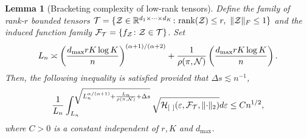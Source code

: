 \documentclass[11pt]{article}
\theoremstyle{plain}
\newtheorem{lem}{Lemma}
\theoremstyle{definition}
\def\rank{\textup{rank}}
\begin{document}
\begin{lem}[Bracketing complexity of low-rank tensors] \label{lem:metric}
Define the family of rank-$r$ bounded tensors $\tT=\{\tZ\in\mathbb{R}^{d_1\times \cdots \times d_K}\colon \rank(\tZ)\leq r, \ \FnormSize{}{\tZ}\leq 1\}$ and the induced function family $\mathcal{F}_{\mathcal{T}} = \{f_{\mathcal{Z}}\colon \mathcal{Z}\in\mathcal{T}\}$.  Set 
\begin{equation}\label{eq:specification}
L_n\asymp \left({d_{\max}rK\log K \over n } \right)^{(\alpha+1)/(\alpha+2)} + {1\over \rho (\pi, \mathcal{N})}\left({d_{\max}rK\log K \over n } \right).
\end{equation}
 Then, the following inequality is satisfied provided that $\Delta s \lesssim n^{-1}$,
\begin{equation}\label{eq:L}
{1\over L_n}\int^{\sqrt{L_n^{\alpha/(\alpha+1)}+{L_n\over \rho (\pi, \mathcal{N})}+\Delta s}}_{L_n} \sqrt{\mathcal{H}_{[\ ]}(\varepsilon, \mathcal{F}_{\mathcal{T}} ,\lVert\cdot\rVert_2) }d\varepsilon \leq Cn^{1/2},
\end{equation}
where $C>0$ is a constant independent of $r,K$  and $d_{\text{max}}$.
\end{lem}
\end{document}
